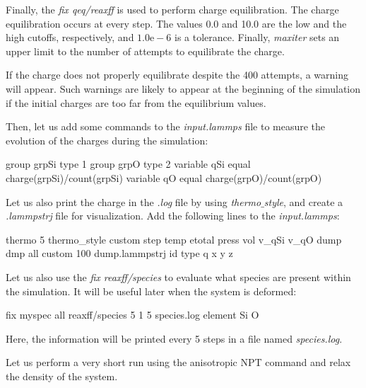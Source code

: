 \vspace{0.25cm} \noindent Finally, the \textit{fix qeq/reaxff} is used to perform charge equilibration. The charge
equilibration occurs at every step. The values 0.0 and 10.0
are the low and the high cutoffs, respectively, and $1.0 \text{e} -6$ is a
tolerance. Finally, \textit{maxiter} sets an upper limit to the number of attempts to
equilibrate the charge. 

\begin{tcolorbox}[colback=mylightblue!5!white,colframe=mylightblue!75!black,title=Note]

\vspace{0.25cm} \noindent If the charge does not
properly equilibrate despite the 400 attempts, a warning will appear. Such warnings
are likely to appear at the beginning of the simulation if the initial charges
are too far from the equilibrium values.
\end{tcolorbox}

\noindent Then, let us add some commands to the \textit{input.lammps} file 
to measure the evolution of the charges during the simulation:

\begin{lcverbatim}
group grpSi type 1
group grpO type 2
variable qSi equal charge(grpSi)/count(grpSi)
variable qO equal charge(grpO)/count(grpO)
\end{lcverbatim}

\noindent Let us also print the charge in the \textit{.log} file by using \textit{thermo$\_$style},
and create a \textit{.lammpstrj} file for visualization.
Add the following lines to the \textit{input.lammps}:

\begin{lcverbatim}
thermo 5
thermo_style custom step temp etotal press vol v_qSi v_qO
dump dmp all custom 100 dump.lammpstrj id type q x y z
\end{lcverbatim}

\noindent Let us also use the \textit{fix reaxff/species} to evaluate what
species are present within the simulation. It will
be useful later when the system is deformed:

\begin{lcverbatim}
fix myspec all reaxff/species 5 1 5 species.log element Si O
\end{lcverbatim}

\noindent Here, the information will be printed every 5 steps in a
file named \textit{species.log}.

\vspace{0.25cm} \noindent Let us perform a very short run using the anisotropic NPT command
and relax the density of the system. 

